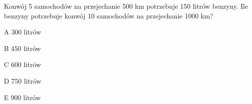 \begin{tresc}
Konwój 5 samochodów na przejechanie 500 km potrzebuje 150 litrów benzyny. Ile benzyny potrzebuje konwój 10 samochodów na przejechanie 1000 km?
\end{tresc}
\begin{wariant}{A} 300 litrów \end{wariant}
\begin{wariant}{B} 450 litrów \end{wariant}
\begin{wariant}{C} 600 litrów \end{wariant}
\begin{wariant}{D} 750 litrów \end{wariant}
\begin{wariant}{E} 900 litrów \end{wariant}
